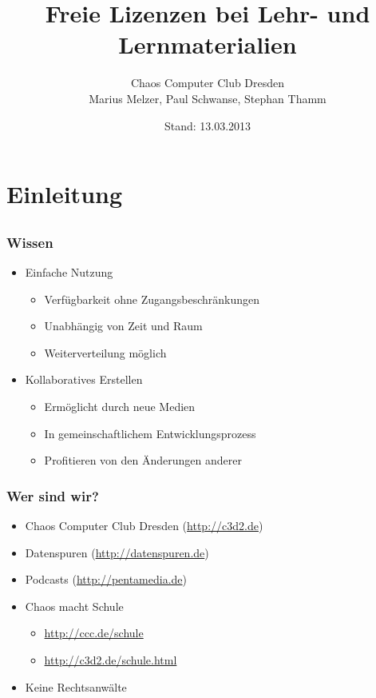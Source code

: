 \documentclass[table]{beamer}
\title{Freie Lizenzen bei Lehr- und Lernmaterialien}
\author{Chaos Computer Club Dresden\\Marius Melzer, Paul Schwanse, Stephan Thamm}
\date{Stand: 13.03.2013}
\begin{document}
\maketitle

\frame{\tableofcontents[hideallsubsections]}

\section{Einleitung}
\subsection{}

\begin{frame}
    \frametitle{Wissen}
    \begin{itemize}
      \item<2-> Einfache Nutzung
      \begin{itemize}
        \item<3-> Verfügbarkeit ohne Zugangsbeschränkungen
        \item<4-> Unabhängig von Zeit und Raum
        \item<5-> Weiterverteilung möglich
      \end{itemize}
      \item<6-> Kollaboratives Erstellen
      \begin{itemize}
        \item<7-> Ermöglicht durch neue Medien
        \item<8-> In gemeinschaftlichem Entwicklungsprozess
        \item<9-> Profitieren von den Änderungen anderer
      \end{itemize}
    \end{itemize}
\end{frame}
 
\begin{frame}
    \frametitle{Wer sind wir?}
    \begin{itemize}
        \item<2-> Chaos Computer Club Dresden (\url{http://c3d2.de})
            \note{}
        \item<3-> Datenspuren (\url{http://datenspuren.de})
        \item<4-> Podcasts (\url{http://pentamedia.de})
        \item<5-> Chaos macht Schule
            \begin{itemize}
                \item<2-> \url{http://ccc.de/schule}
                \item<2-> \url{http://c3d2.de/schule.html}
            \end{itemize}
        \item<6-> Keine Rechtsanwälte
    \end{itemize}
\end{frame}
\end{document}
